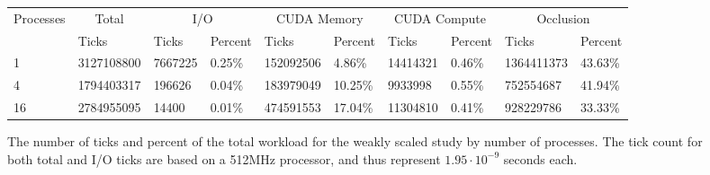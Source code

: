 \documentclass[conference]{IEEEtran}
\begin{document}
\begin{figure}
\centering
\begin{tabular}{|l|l|ll|ll|ll|ll|}
\hline
\multirow{2}{*}{Processes} & \multicolumn{1}{c|}{Total} & \multicolumn{2}{c|}{I/O}               & \multicolumn{2}{c|}{CUDA Memory}         & \multicolumn{2}{c|}{CUDA Compute}       & \multicolumn{2}{c|}{Occlusion}            \\ \cline{2-10} 
                           & Ticks                      & \multicolumn{1}{l|}{Ticks}   & Percent & \multicolumn{1}{l|}{Ticks}     & Percent & \multicolumn{1}{l|}{Ticks}    & Percent & \multicolumn{1}{l|}{Ticks}      & Percent \\ \hline
1                          & 3127108800                 & \multicolumn{1}{l|}{7667225} & 0.25\%  & \multicolumn{1}{l|}{152092506} & 4.86\%  & \multicolumn{1}{l|}{14414321} & 0.46\%  & \multicolumn{1}{l|}{1364411373} & 43.63\% \\ \hline
4                          & 1794403317                 & \multicolumn{1}{l|}{196626}  & 0.04\%  & \multicolumn{1}{l|}{183979049} & 10.25\% & \multicolumn{1}{l|}{9933998}  & 0.55\%  & \multicolumn{1}{l|}{752554687}  & 41.94\% \\ \hline
16                         & 2784955095                 & \multicolumn{1}{l|}{14400}   & 0.01\%  & \multicolumn{1}{l|}{474591553} & 17.04\% & \multicolumn{1}{l|}{11304810} & 0.41\%  & \multicolumn{1}{l|}{928229786}  & 33.33\% \\ \hline
\end{tabular}
\caption{The number of ticks and percent of the total workload for the weakly scaled study by number of processes. The tick count for both total and I/O ticks are based on a 512MHz processor, and thus represent $1.95\cdot 10^{-9}$ seconds each.}
\label{fig:weaktable_ticks}
\end{figure}
\vspace{0.05in}
\end{document}
